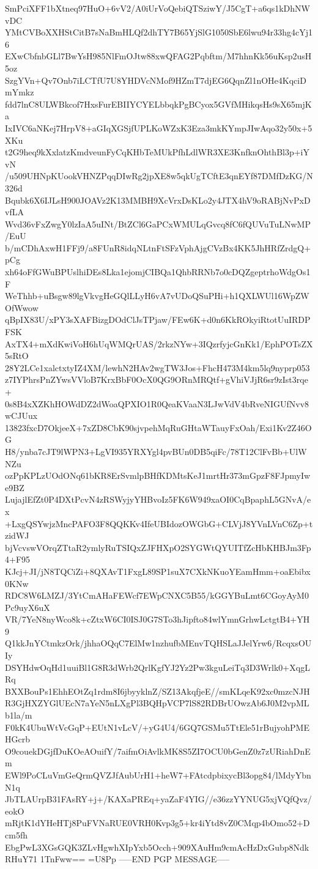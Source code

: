 SmPciXFF1bXtneq97HuO+6vV2/A0iUrVoQebiQTSziwY/J5CgT+a6qs1kDhNWvDC
YMtCVBoXXHStCitB7sNaBmHLQf2dhTY7B65YjSlG1050SbE6lwu94r33hg4cYj16
EXwCbfnbGLl7BwYsH985NlFmOJtw88xwQFAG2Pqbftm/M7hhnKk56uKsp2usH5oz
SzgYVn+Qv7Onb7iLCTfU7U8YHDVcNMof9HZmT7djEG6QqnZl1nOHe4KqciDmYmkz
fdd7lnC8ULWBkcof7HxsFurEBIIYCYELbbqkPgBCyox5GVfMHikqsHs9sX65mjKa
IxIVC6aNKej7HrpV8+aGIqXGSjfUPLKoWZxK3Eza3mkKYmpJIwAqo32y50x+5XKu
t2G9heq9kXxlatzKmdveunFyCqKHbTeMUkPfhLdlWR3XE3KnfknOhthBl3p+iYvN
/u509UHNpKUookVHNZPqqDIwRg2jpXE8w5qkUgTCftE3qnEYf87DMfDzKG/N326d
Bqubk6X6IJLsH900JOAVz2K13MMBH9XcVrxDsKLo2y4JTX4hV9oRABjNvPxDvfLA
Wvd36vFxZwgY0lzIaA5uINt/BtZCl6GaPCxWMULqGvcq8fC6fQUVuTuLNwMP/EuU
b/mCDhAxwH1FFj9/a8FUnR8idqNLtnFtSFzVphAjgCVzBx4KK5JhHRfZrdgQ+pCg
xh64oFfGWuBPUslhiDEs8Lka1ejomjCIBQa1QhbRRNb7o0cDQZgeptrhoWdgOs1F
WeThhb+uBsgw89lgVkvgHeGQlLLyH6vA7vUDoQSuPHi+h1QXLWUl16WpZWOfWwow
qBpIX83U/xPY3sXAFBizgDOdClJsTPjaw/FEw6K+d0n6KkROkyiRtotUuIRDPFSK
AxTX4+mXdKwiVoH6hUqWMQrUAS/2rkzNYw+3IQzrfyjcGnKk1/EphPOTsZX5sRtO
28Y2LCe1xalctxtyIZ4XM/lewhN2HAv2wgTW3Jos+FhcH473M4km5lq9nyprp053
z7IYPhrsPnZYwsVVloB7KrxBbF0OcX0QG9ORnMRQtf+gVhiVJjR6sr9zIst3rqe+
0s8B4xXZKhHOWdDZ2dWoaQPXIO1R0QeaKVaaN3LJwVdV4bRveNIGUfNvv8wCJUux
13823fxcD7OkjeeX+7xZD8CbK90sjvpehMqRuGHtaWTauyFxOah/Exi1Kv2Z46OG
H8/ynba7cJT9lWPN3+LgVI935YRXYgl4pvBUn0DB5qiFc/78T12ClFvBb+UlWNZu
ozPpKPLzUOdONq61bKR8ErSvmlpBHfKDMtsKeJ1mrtHr373mGpzF8FJpmyIwe9BZ
LujajlEfZt0P4DXtPcvN4zRSWyjyYHBvoIz5FK6W949xaOI0CqBpaphL5GNvA/ex
+LxgQSYwjzMncPAFO3F8QQKKv4IfeUBIdozOWGbG+CLVjJ8YVnLVnC6Zp+tzidWJ
bjVcvswVOrqZTtaR2ymlyRuTSIQxZJFHXpO2SYGWtQYUITfZcHbKHBJm3Fp4+F95
KJcj+JI/jN8TQCiZi+8QXAvT1FxgL89SP1suX7CXkNKuoYEamHmm+oaEbibx0KNw
RDC8W6LMZJ/3YtCmAHaFEWcf7EWpCNXC5B55/kGGYBuLmt6CGoyAyM0Pc9uyX6uX
VR/7YeN8nyWco8k+cZtxW6CI0ISJ0G7STo3hJipfto84wlYmnGrhwLctgtB4+YH9
Q1kkJnYCtmkzOrk/jhhaOQqC7ElMw1nzhufbMEnvTQHSLaJJelYrw6/RcqxsOUIy
DSYHdwOqHd1uuiBl1G8R3dWrb2QrlKgfYJ2Yz2Pw3kguLeiTq3D3Wrlk0+XqgLRq
BXXBouPs1EhhEOtZq1rdm8I6jbyyklnZ/SZ13AkqfjeE//smKLqeK92xc0mzcNJH
R3GjHXZYGlUEcN7aYeN5nLXgPl3BQHpVCP7lS82RDBrUOwzAb6J0M2vpMLb1la/m
F0kK4UbuWtVcGqP+EUtN1vLcV/+yG4U4/6GQ7GSMu5TtEle51rBujyohPMEHGcrb
O9couekDGjfDuKOeAOuifY/7aifmOiAvlkMK8S5ZI7OCU0bGenZ0z7zURiahDnEm
EWl9PoCLuVmGeQrmQVZJfAubUrH1+heW7+FAtcdpbixycBl3opg84/lMdyYbnN1q
JbTLAUrpB31FAsRY+j+/KAXaPREq+yaZaF4YIG//e36zzYYNUG5xjVQfQvz/eokO
mRjtK1dYHeHTj8PuFVNaRUE0VRH0Kvp3g5+kr4iYtd8vZ0CMqp4bOmo52+Dcm5fh
EbgPwL3XGsGQK3ZLvHgwhXIpYxb5Occh+909XAuHm9cmAcHzDxGubp8NdkRHuY71
1TnFww==
=U8Pp
-----END PGP MESSAGE-----
